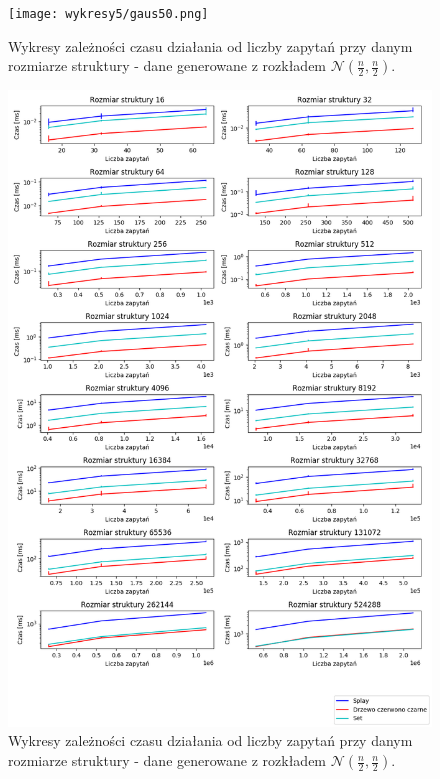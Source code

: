 \documentclass[declaration,shortabstract]{iithesis}
\theoremstyle{thm}
\theoremstyle{remark}
\theoremstyle{plain}
\theoremstyle{plain}
\theoremstyle{plain}
\begin{document}
\begin{figure}[H]  

\centering
    \texttt{[image: wykresy5/gaus50.png]}
      \caption{Wykresy zależności czasu działania od liczby zapytań przy danym rozmiarze struktury - dane generowane z rozkładem \(\mathcal{N}(\frac{n}{2}, \frac{n}{2})\). }  
\end{figure}
\begin{figure}[H]  

\centering
    \includegraphics[scale=0.45]{wykresy3/gaus50.png}
      \caption{Wykresy zależności czasu działania od liczby zapytań przy danym rozmiarze struktury - dane generowane z rozkładem \(\mathcal{N}(\frac{n}{2}, \frac{n}{2})\). }  
\end{figure}
\end{document}
